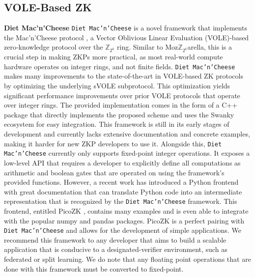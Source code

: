 

\subsection{VOLE-Based ZK}


\textbf{Diet Mac'n'Cheese}
\texttt{Diet Mac'n'Cheese} \cite{dietmc} is a novel framework that implements the Mac'n'Cheese protocol \cite{baum2021mac}, a Vector Oblivious Linear Evaluation (VOLE)-based zero-knowledge protocol over the $\mathbb{Z}_{2^k}$ ring. Similar to Moz$\mathbb{Z}_{2^k}$arella, this is a crucial step in making ZKPs more practical, as most real-world compute hardware operates on integer rings, and not finite fields. \texttt{Diet Mac'n'Cheese} makes many improvements to the state-of-the-art in VOLE-based ZK protocols by optimizing the underlying sVOLE subprotocol. This optimization yields significant performance improvements over prior VOLE protocols that operate over integer rings. The provided implementation comes in the form of a C++ package that directly implements the proposed scheme and uses the Swanky ecosystem \cite{swanky} for easy integration. This framework is still in its early stages of development and currently lacks extensive documentation and concrete examples, making it harder for new ZKP developers to use it. Alongside this, \texttt{Diet Mac'n'Cheese} currently only supports fixed-point integer operations. It exposes a low-level API that requires a developer to explicitly define all computations as arithmetic and boolean gates that are operated on using the framework's provided functions. However, a recent work has introduced a Python frontend with great documentation that can translate Python code into an intermediate representation that is recognized by the \texttt{Diet Mac'n'Cheese} framework. This frontend, entitled PicoZK \cite{picozk}, contains many examples and is even able to integrate with the popular numpy and pandas packages. PicoZK is a perfect pairing with \texttt{Diet Mac'n'Cheese} and allows for the development of simple applications. We recommend this framework to any developer that aims to build a scalable application that is conducive to a designated-verifier environment, such as federated or split learning. We do note that any floating point operations that are done with this framework must be converted to fixed-point.

